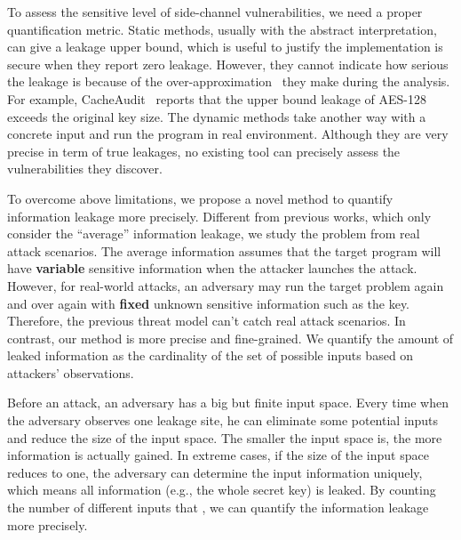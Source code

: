 To assess the sensitive level of side-channel vulnerabilities, we need a proper 
quantification metric.
Static methods, usually with the abstract interpretation, can give a leakage upper bound, 
which is useful to justify the implementation is secure when they report zero leakage. 
However, they cannot indicate how serious the leakage is because of the over-approximation~\cite{}
they make during the analysis. 
For example, CacheAudit~\cite{} reports that the upper bound leakage of AES-128 exceeds 
the original key size. The dynamic methods take another way with a concrete input and 
run the program in real environment. Although they are very precise in term of true leakages, 
no existing tool can precisely assess the vulnerabilities they discover.

To overcome above limitations, we propose a novel method
to quantify information leakage more precisely. 
Different from previous works, which only consider the
``average'' information leakage, we study the problem from real attack scenarios.
The average information assumes that the target program will have \textbf{variable} sensitive 
information when the attacker launches the attack.
However, for real-world attacks, an adversary may run the target problem again and over again 
with \textbf{fixed} unknown sensitive information such as the key. 
Therefore, the previous threat model can't catch real attack scenarios.
In contrast, our method is more precise and fine-grained. 
We quantify the amount of leaked information as the cardinality of the set of possible inputs 
based on attackers' observations. 

Before an attack, an adversary has a big but finite input space.
Every time when the adversary observes one leakage site, he can eliminate some 
potential inputs and reduce the size of the input space. 
The smaller the input space is, the more information is actually gained. 
In extreme cases, if the size of the input space reduces to one, 
the adversary can determine the input information uniquely, which means all information
(e.g., the whole secret key) is leaked. By counting the number of different inputs that
, we can quantify the information leakage more precisely.


